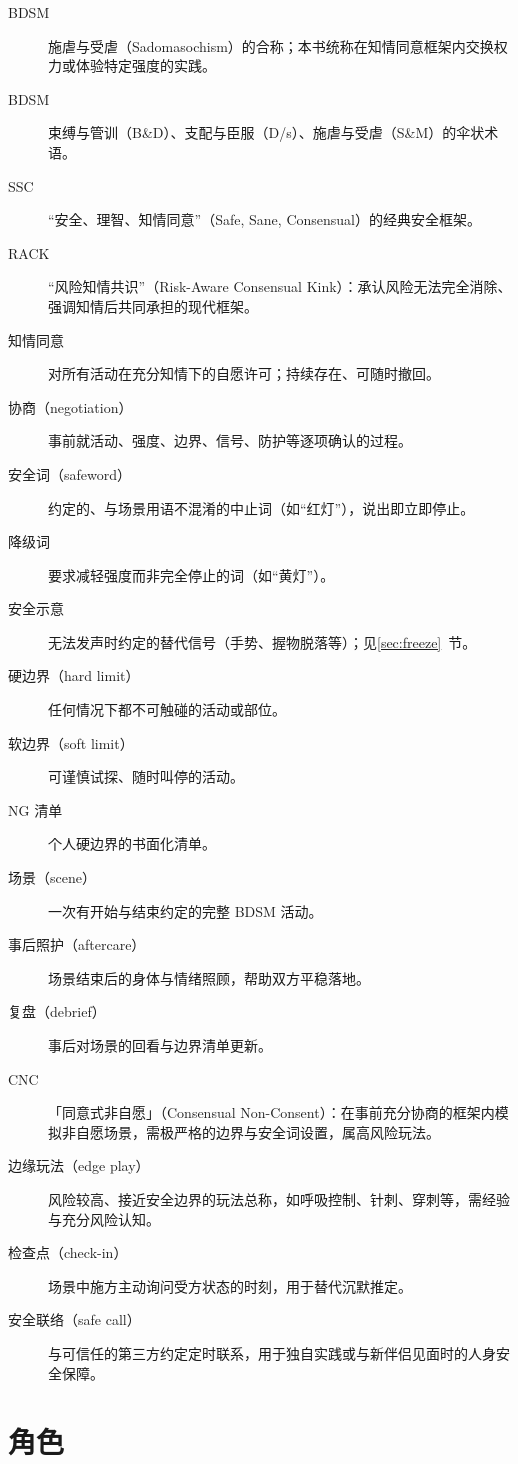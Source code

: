 \documentclass[12pt,UTF8]{ctexbook}
\begin{document}
\begin{description}
\item[BDSM] 施虐与受虐（Sadomasochism）的合称；本书统称在知情同意框架内交换权力或体验特定强度的实践。
\item[BDSM] 束缚与管训（B\&D）、支配与臣服（D/s）、施虐与受虐（S\&M）的伞状术语。
\item[SSC] “安全、理智、知情同意”（Safe, Sane, Consensual）的经典安全框架。
\item[RACK] “风险知情共识”（Risk-Aware Consensual Kink）：承认风险无法完全消除、强调知情后共同承担的现代框架。
\item[知情同意] 对所有活动在充分知情下的自愿许可；持续存在、可随时撤回。
\item[协商（negotiation）] 事前就活动、强度、边界、信号、防护等逐项确认的过程。
\item[安全词（safeword）] 约定的、与场景用语不混淆的中止词（如“红灯”），说出即立即停止。
\item[降级词] 要求减轻强度而非完全停止的词（如“黄灯”）。
\item[安全示意] 无法发声时约定的替代信号（手势、握物脱落等）；见\ref{sec:freeze}~节。
\item[硬边界（hard limit）] 任何情况下都不可触碰的活动或部位。
\item[软边界（soft limit）] 可谨慎试探、随时叫停的活动。
\item[NG 清单] 个人硬边界的书面化清单。
\item[场景（scene）] 一次有开始与结束约定的完整 BDSM 活动。
\item[事后照护（aftercare）] 场景结束后的身体与情绪照顾，帮助双方平稳落地。
\item[复盘（debrief）] 事后对场景的回看与边界清单更新。
\item[CNC] 「同意式非自愿」（Consensual Non-Consent）：在事前充分协商的框架内模拟非自愿场景，需极严格的边界与安全词设置，属高风险玩法。
\item[边缘玩法（edge play）] 风险较高、接近安全边界的玩法总称，如呼吸控制、针刺、穿刺等，需经验与充分风险认知。
\item[检查点（check-in）] 场景中施方主动询问受方状态的时刻，用于替代沉默推定。
\item[安全联络（safe call）] 与可信任的第三方约定定时联系，用于独自实践或与新伴侣见面时的人身安全保障。
\end{description}

\section{角色}
\end{document}
